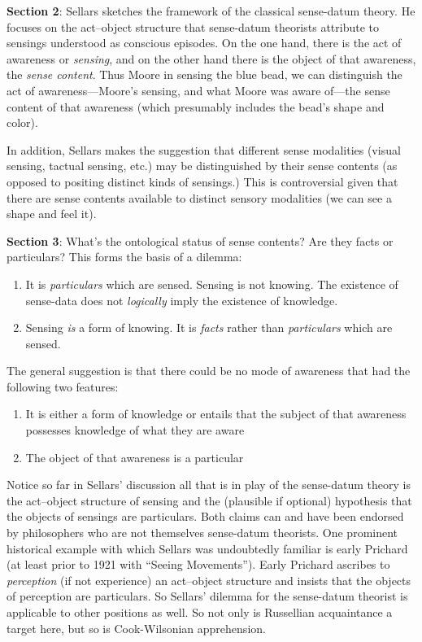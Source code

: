 \documentclass[11pt]{article}
\begin{document}
\textbf{Section 2}: Sellars sketches the framework of the classical sense-datum theory. He focuses on the act--object structure that sense-datum theorists attribute to sensings understood as conscious episodes. On the one hand, there is the act of awareness or \emph{sensing}, and on the other hand there is the object of that awareness, the \emph{sense content}. Thus Moore in sensing the blue bead, we can distinguish the act of awareness---Moore's sensing, and what Moore was aware of---the sense content of that awareness (which presumably includes the bead's shape and color).

In addition, Sellars makes the suggestion that different sense modalities (visual sensing, tactual sensing, etc.) may be distinguished by their sense contents (as opposed to positing distinct kinds of sensings.) This is controversial given that there are sense contents available to distinct sensory modalities (we can see a shape and feel it).

\textbf{Section 3}: What's the ontological status of sense contents? Are they facts or particulars? This forms the basis of a dilemma:
\begin{enumerate}
	\item It is \emph{particulars} which are sensed. Sensing is not knowing. The existence of sense-data does not \emph{logically} imply the existence of knowledge.
	\item Sensing \emph{is} a form of knowing. It is \emph{facts} rather than \emph{particulars} which are sensed.
\end{enumerate}

The general suggestion is that there could be no mode of awareness that had the following two features:
\begin{enumerate}
    \item It is either a form of knowledge or entails that the subject of that awareness possesses knowledge of what they are aware
    \item The object of that awareness is a particular
\end{enumerate}
Notice so far in Sellars' discussion all that is in play of the sense-datum theory is the act--object structure of sensing and the (plausible if optional) hypothesis that the objects of sensings are particulars. Both claims can and have been endorsed by philosophers who are not themselves sense-datum theorists. One prominent historical example with which Sellars was undoubtedly familiar is early Prichard (at least prior to 1921 with ``Seeing Movements''). Early Prichard ascribes to \emph{perception} (if not experience) an act--object structure and insists that the objects of perception are particulars. So Sellars' dilemma for the sense-datum theorist is applicable to other positions as well. So not only is Russellian acquaintance a target here, but so is Cook-Wilsonian apprehension.
\end{document}

